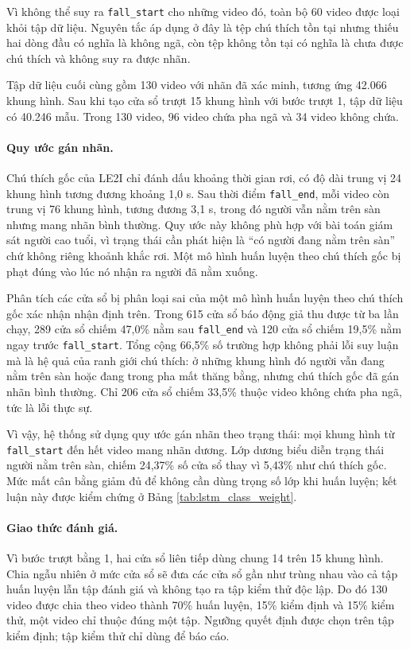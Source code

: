 Vì không thể suy ra \texttt{fall\_start} cho những video đó, toàn bộ 60 video được loại khỏi tập dữ liệu. Nguyên tắc áp dụng ở đây là tệp chú thích tồn tại nhưng thiếu hai dòng đầu có nghĩa là không ngã, còn tệp không tồn tại có nghĩa là chưa được chú thích và không suy ra được nhãn.

Tập dữ liệu cuối cùng gồm 130 video với nhãn đã xác minh, tương ứng 42.066 khung hình. Sau khi tạo cửa sổ trượt 15 khung hình với bước trượt 1, tập dữ liệu có 40.246 mẫu. Trong 130 video, 96 video chứa pha ngã và 34 video không chứa.

\paragraph{Quy ước gán nhãn.}
Chú thích gốc của LE2I chỉ đánh dấu khoảng thời gian rơi, có độ dài trung vị 24 khung hình tương đương khoảng 1,0 s. Sau thời điểm \texttt{fall\_end}, mỗi video còn trung vị 76 khung hình, tương đương 3,1 s, trong đó người vẫn nằm trên sàn nhưng mang nhãn bình thường. Quy ước này không phù hợp với bài toán giám sát người cao tuổi, vì trạng thái cần phát hiện là ``có người đang nằm trên sàn'' chứ không riêng khoảnh khắc rơi. Một mô hình huấn luyện theo chú thích gốc bị phạt đúng vào lúc nó nhận ra người đã nằm xuống.

Phân tích các cửa sổ bị phân loại sai của một mô hình huấn luyện theo chú thích gốc xác nhận nhận định trên. Trong 615 cửa sổ báo động giả thu được từ ba lần chạy, 289 cửa sổ chiếm 47,0\% nằm sau \texttt{fall\_end} và 120 cửa sổ chiếm 19,5\% nằm ngay trước \texttt{fall\_start}. Tổng cộng 66,5\% số trường hợp không phải lỗi suy luận mà là hệ quả của ranh giới chú thích: ở những khung hình đó người vẫn đang nằm trên sàn hoặc đang trong pha mất thăng bằng, nhưng chú thích gốc đã gán nhãn bình thường. Chỉ 206 cửa sổ chiếm 33,5\% thuộc video không chứa pha ngã, tức là lỗi thực sự.

Vì vậy, hệ thống sử dụng quy ước gán nhãn theo trạng thái: mọi khung hình từ \texttt{fall\_start} đến hết video mang nhãn dương. Lớp dương biểu diễn trạng thái người nằm trên sàn, chiếm 24,37\% số cửa sổ thay vì 5,43\% như chú thích gốc. Mức mất cân bằng giảm đủ để không cần dùng trọng số lớp khi huấn luyện; kết luận này được kiểm chứng ở Bảng \ref{tab:lstm_class_weight}.

\paragraph{Giao thức đánh giá.}
Vì bước trượt bằng 1, hai cửa sổ liên tiếp dùng chung 14 trên 15 khung hình. Chia ngẫu nhiên ở mức cửa sổ sẽ đưa các cửa sổ gần như trùng nhau vào cả tập huấn luyện lẫn tập đánh giá và không tạo ra tập kiểm thử độc lập. Do đó 130 video được chia theo video thành 70\% huấn luyện, 15\% kiểm định và 15\% kiểm thử, một video chỉ thuộc đúng một tập. Ngưỡng quyết định được chọn trên tập kiểm định; tập kiểm thử chỉ dùng để báo cáo.

